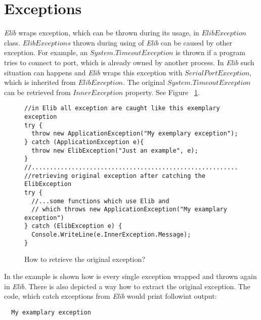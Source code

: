 \section*{Exceptions}
  {\it Elib} wraps exception, which can be thrown during its usage, in $ ElibException$ class.
  $ElibExceptions$ thrown during using of {\it Elib} can be caused by other exception.
  For example, an $System.TimeoutException$ is thrown if a program tries to connect to port, 
  which is already owned by another process.
  In {\it Elib} such situation can happens and {\it Elib} wraps this exception
  with $SerialPortException$, which is inherited from $ElibException$.
  The original $System.TimeoutException$ can be retrieved from $InnerException$ property.
  See Figure ~\ref{exceptionuse}.
\begin{figure}[!hbp]
\begin{lstlisting}
//in Elib all exception are caught like this exemplary exception
try {
  throw new ApplicationException("My exemplary exception");
} catch (ApplicationException e){
  throw new ElibException("Just an example", e);
}
//........................................................................
//retrieving original exception after catching the ElibException
try {
  //...some functions which use Elib and 
  // which throws new ApplicationException("My examplary exception")
} catch (ElibException e) {
  Console.WriteLine(e.InnerException.Message);
}
\end{lstlisting}
\caption{How to retrieve the original exception?}
\label{exceptionuse}
\end{figure}
  In the example is shown how is every single exception wrapped and thrown again in {\it Elib}.
  There is also depicted a way how to extract the original exception.
  The code, which catch exceptions from {\it Elib} would print followint output:
\begin{verbatim}
  My examplary exception
\end{verbatim}


